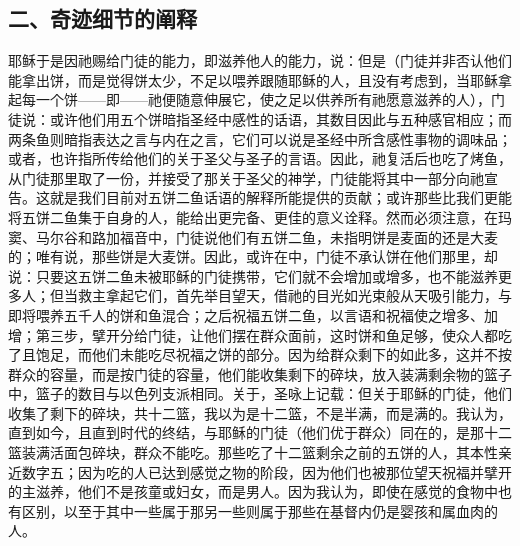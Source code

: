 \subsection{二、奇迹细节的阐释}

耶稣于是因祂赐给门徒的能力，即滋养他人的能力，说：\newline{}但是（门徒并非否认他们能拿出饼，而是觉得饼太少，不足以喂养跟随耶稣的人，且没有考虑到，当耶稣拿起每一个饼——即——祂便随意伸展它，使之足以供养所有祂愿意滋养的人），门徒说：\newline{}或许他们用五个饼暗指圣经中感性的话语，其数目因此与五种感官相应；而两条鱼则暗指表达之言与内在之言，它们可以说是圣经中所含感性事物的调味品；或者，也许指所传给他们的关于圣父与圣子的言语。因此，祂复活后也吃了烤鱼，\newline{}从门徒那里取了一份，并接受了那关于圣父的神学，门徒能将其中一部分向祂宣告。这就是我们目前对五饼二鱼话语的解释所能提供的贡献；或许那些比我们更能将五饼二鱼集于自身的人，能给出更完备、更佳的意义诠释。然而必须注意，在玛窦、马尔谷和路加福音中，门徒说他们有五饼二鱼，未指明饼是麦面的还是大麦的；唯有说，那些饼是大麦饼。\newline{}因此，或许在中，门徒不承认饼在他们那里，却说：\newline{}只要这五饼二鱼未被耶稣的门徒携带，它们就不会增加或增多，也不能滋养更多人；但当救主拿起它们，首先举目望天，借祂的目光如光束般从天吸引能力，与即将喂养五千人的饼和鱼混合；之后祝福五饼二鱼，以言语和祝福使之增多、加增；第三步，擘开分给门徒，让他们摆在群众面前，这时饼和鱼足够，使众人都吃了且饱足，而他们未能吃尽祝福之饼的部分。因为给群众剩下的如此多，这并不按群众的容量，而是按门徒的容量，他们能收集剩下的碎块，放入装满剩余物的篮子中，篮子的数目与以色列支派相同。关于，圣咏上记载：但关于耶稣的门徒，他们收集了剩下的碎块，共十二篮，我以为是十二篮，不是半满，而是满的。我认为，直到如今，且直到时代的终结，与耶稣的门徒（他们优于群众）同在的，是那十二篮装满活面包碎块，群众不能吃。那些吃了十二篮剩余之前的五饼的人，其本性亲近数字五；因为吃的人已达到感觉之物的阶段，因为他们也被那位望天祝福并擘开的主滋养，他们不是孩童或妇女，而是男人。因为我认为，即使在感觉的食物中也有区别，以至于其中一些属于那\newline{}另一些则属于那些在基督内仍是婴孩和属血肉的人。\par

